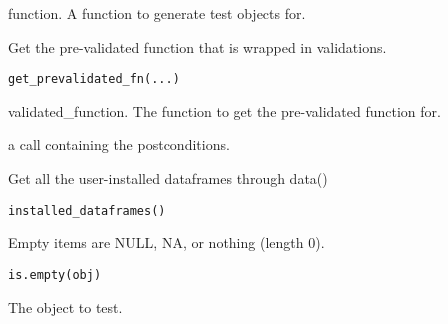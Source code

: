 \documentclass[a4paper]{book}
\begin{document}
%
\begin{Arguments}
\begin{ldescription}
\item[\code{fn}] function. A function to generate test objects for.
\end{ldescription}
\end{Arguments}
%
\begin{Description}\relax
Get the pre-validated function that is wrapped in validations.
\end{Description}
%
\begin{Usage}
\begin{verbatim}
get_prevalidated_fn(...)
\end{verbatim}
\end{Usage}
%
\begin{Arguments}
\begin{ldescription}
\item[\code{fn}] validated\_function. The function to get the pre-validated function for.
\end{ldescription}
\end{Arguments}
%
\begin{Value}
a call containing the postconditions.
\end{Value}
%
\begin{Description}\relax
Get all the user-installed dataframes through data()
\end{Description}
%
\begin{Usage}
\begin{verbatim}
installed_dataframes()
\end{verbatim}
\end{Usage}
%
\begin{Description}\relax
Empty items are NULL, NA, or nothing (length 0).
\end{Description}
%
\begin{Usage}
\begin{verbatim}
is.empty(obj)
\end{verbatim}
\end{Usage}
%
\begin{Arguments}
\begin{ldescription}
\item[\code{obj.}] The object to test.
\end{ldescription}
\end{Arguments}
\end{document}
